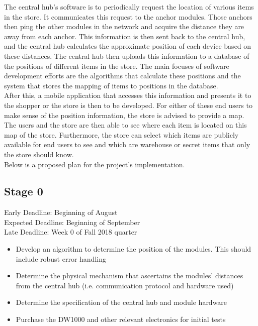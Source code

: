 \documentclass{article}
\begin{document}
The central hub's software is to periodically request the location of various items in the store.
It communicates this request to the anchor modules.
Those anchors then ping the other modules in the network and acquire the distance they are away from each anchor.
This information is then sent back to the central hub, and the central hub calculates the approximate position of each device based on these distances.
The central hub then uploads this information to a database of the positions of different items in the store.
The main focuses of software development efforts are the algorithms that calculate these positions and the system that stores the mapping of items to positions in the database. \\

After this, a mobile application that accesses this information and presents it to the shopper or the store is then to be developed.
For either of these end users to make sense of the position information, the store is advised to provide a map.
The users and the store are then able to see where each item is located on this map of the store.
Furthermore, the store can select which items are publicly available for end users to see and which are warehouse or secret items that only the store should know. \\

Below is a proposed plan for the project's implementation.
\subsection{Stage 0}
Early Deadline: Beginning of August \\
Expected Deadline: Beginning of September \\
Late Deadline: Week 0 of Fall 2018 quarter \\
\begin{itemize}
\item Develop an algorithm to determine the position of the modules. This should include robust error handling
\item Determine the physical mechanism that ascertains the modules' distances from the central hub (i.e. communication protocol and hardware used)
\item Determine the specification of the central hub and module hardware
\item Purchase the DW1000 and other relevant electronics for initial tests
\end{itemize}
\end{document}
